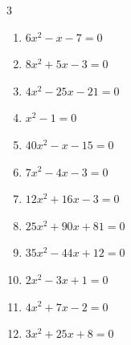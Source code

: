\begin{multicols}{3}
\begin{enumerate}

  \item $6x^{2}-x-7=0$


  \item $8x^{2}+5x-3=0$


\columnbreak %

\resetques

  \item $4x^{2}-25x-21=0$


  \item $x^{2}-1=0$

        \phantom{$\displaystyle x=1,\; -1$}

  \item $40x^{2}-x-15=0$


  \item $7x^{2}-4x-3=0$


  \item $12x^{2}+16x-3=0$


  \item $25x^{2}+90x+81=0$


  \item $35x^{2}-44x+12=0$


  \item $2x^{2}-3x+1=0$


  \item $4x^{2}+7x-2=0$


  \item $3x^{2}+25x+8=0$



\end{enumerate}
\end{multicols}
